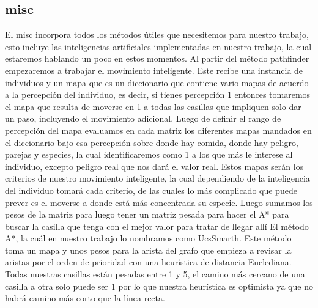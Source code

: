\documentclass{llncs}
\begin{document}


\subsection{misc}
El misc incorpora todos los métodos útiles que necesitemos para nuestro trabajo, esto incluye las inteligencias artificiales implementadas en nuestro trabajo, la cual estaremos hablando un poco en estos momentos.
\newline
\newline
Al partir del método pathfinder empezaremos a trabajar el movimiento inteligente. Este recibe una instancia de individuos y un mapa que es un diccionario que contiene vario mapas de acuerdo a la percepción del individuo, es decir, si tienes percepción 1 entonces tomaremos el mapa que resulta de moverse en 1 a todas las casillas que impliquen solo dar un paso, incluyendo el movimiento adicional.
\newline
\newline
Luego de definir el rango de percepción del mapa evaluamos en cada matriz los diferentes mapas mandados en el diccionario bajo esa percepción sobre donde hay comida, donde hay peligro, parejas y especies, la cual identificaremos como 1 a los que más le interese al individuo, excepto peligro real que nos dará el valor real. Estos mapas serán los criterios de nuestro movimiento inteligente, la cual dependiendo de la inteligencia del individuo tomará cada criterio, de las cuales lo más complicado que puede prever es el moverse a donde está más concentrada su especie.
\newline
\newline
Luego sumamos los pesos de la matriz para luego tener un matriz pesada para hacer el A* para buscar la casilla que tenga con el mejor valor para tratar de llegar allí
\newline
\newline
El método A*, la cuál en nuestro trabajo lo nombramos como UcsSmarth. Este método toma un mapa y unos pesos para la arista del grafo que empieza a revisar la aristas por el orden de prioridad con una heurística de distancia Euclediana. Todas nuestras casillas están pesadas entre 1 y 5, el camino más cercano de una casilla a otra solo puede ser 1 por lo que nuestra heurística es optimista ya que no habrá camino más corto que la línea recta.
\newline
\newline
\end{document}
